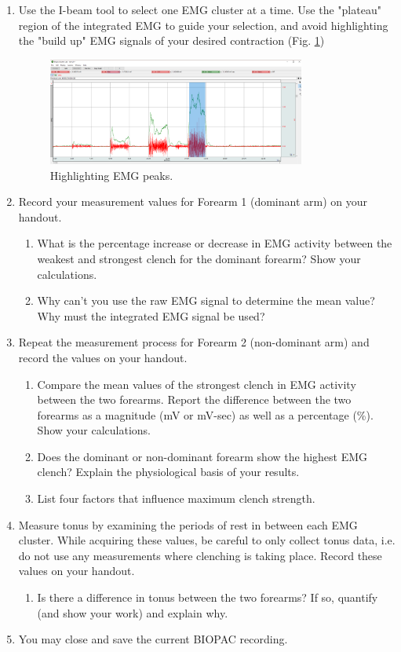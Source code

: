 \documentclass{article}
\begin{document}
\begin{enumerate}
	\item Use the I-beam tool to select one EMG cluster at a time. Use the "plateau" region of the integrated EMG to guide your selection, and avoid highlighting the "build up" EMG signals of your desired contraction (Fig. \ref{highlighting})
		\begin{figure}[h]
	\includegraphics[width=0.8\textwidth]{../images/EMG_I_16.png}	
		\centering
		\caption{Highlighting EMG peaks.}
		\label{highlighting}
		\end{figure}
	
	\item Record your measurement values for Forearm 1 (dominant arm) on your handout.
	\begin{enumerate}
		\item What is the percentage increase or decrease in EMG activity between the weakest and strongest clench for the dominant forearm? Show your calculations.
		\item Why can't you use the raw EMG signal to determine the mean value? Why must the integrated EMG signal be used?
	\end{enumerate}
	\item Repeat the measurement process for Forearm 2 (non-dominant arm) and record the values on your handout.
	\begin{enumerate}
		\item Compare the mean values of the strongest clench in EMG activity between the two forearms. Report the difference between the two forearms as a magnitude (mV or mV-sec) as well as a percentage (\%). Show your calculations.
		\item Does the dominant or non-dominant forearm show the highest EMG clench? Explain the physiological basis of your results.
		\item List four factors that influence maximum clench strength.
	\end{enumerate}
	
	\item Measure tonus by examining the periods of rest in between each EMG cluster. While acquiring these values, be careful to only collect tonus data, i.e. do not use any measurements where clenching is taking place. Record these values on your handout.
	\begin{enumerate}
		\item Is there a difference in tonus between the two forearms? If so, quantify (and show your work) and explain why.
	\end{enumerate}
	\item You may close and save the current BIOPAC recording.
\end{enumerate}
\end{document}
